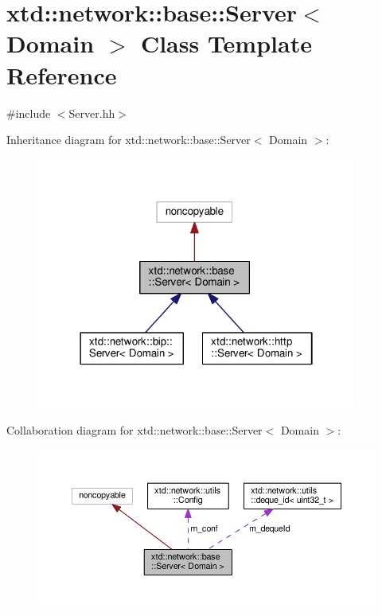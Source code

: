 \hypertarget{classxtd_1_1network_1_1base_1_1Server}{}\section{xtd\+:\+:network\+:\+:base\+:\+:Server$<$ Domain $>$ Class Template Reference}
\label{classxtd_1_1network_1_1base_1_1Server}


{\ttfamily \#include $<$Server.\+hh$>$}



Inheritance diagram for xtd\+:\+:network\+:\+:base\+:\+:Server$<$ Domain $>$\+:
\nopagebreak
\begin{figure}[H]
\begin{center}
\leavevmode
\includegraphics[width=298pt]{classxtd_1_1network_1_1base_1_1Server__inherit__graph}
\end{center}
\end{figure}


Collaboration diagram for xtd\+:\+:network\+:\+:base\+:\+:Server$<$ Domain $>$\+:
\nopagebreak
\begin{figure}[H]
\begin{center}
\leavevmode
\includegraphics[width=350pt]{classxtd_1_1network_1_1base_1_1Server__coll__graph}
\end{center}
\end{figure}
